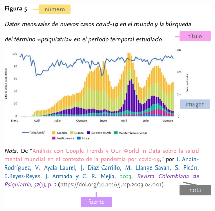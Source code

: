 \documentclass[
11pt, %
]{beamer}
\begin{document}
\begin{frame}
\begin{columns}[c]
\begin{column}{0.5\textwidth}
		\end{column}
		\begin{column}{0.5\textwidth} %
			\begin{figure}
				\centering
				\includegraphics[width=0.9\linewidth]{images/screenshot015}
			\end{figure}

		\end{column}
	\end{columns}

\end{frame}
\end{document}
